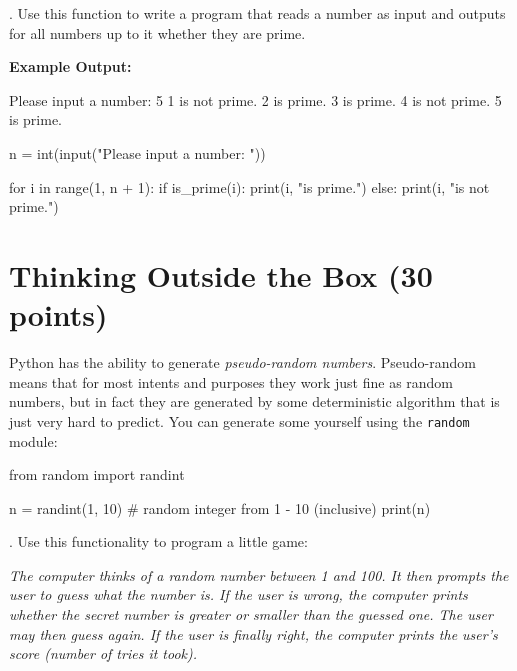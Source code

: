\vspace{1em}

. Use this function to write a program that reads a number as input and outputs for all numbers up to it whether they are prime.

\vspace{1em}

\noindent \textbf{Example Output:}

\begin{outputcode}
Please input a number: 5
1 is not prime.
2 is prime.
3 is prime.
4 is not prime.
5 is prime.
\end{outputcode}

\begin{solution}
    \begin{pythoncode}
n = int(input("Please input a number: "))

for i in range(1, n + 1):
    if is_prime(i):
        print(i, "is prime.")
    else:
        print(i, "is not prime.")
    \end{pythoncode}
\end{solution}

\section{Thinking Outside the Box (30 points)}

Python has the ability to generate \textit{pseudo-random numbers}. Pseudo-random means that for most intents and purposes they work just fine as random numbers, but in fact they are generated by some deterministic algorithm that is just very hard to predict. You can generate some yourself using the \texttt{random} module:

\begin{pythoncode}
from random import randint

n = randint(1, 10)  # random integer from 1 - 10 (inclusive)
print(n)
\end{pythoncode}

. Use this functionality to program a little game:

\vspace{1em}

\textit{The computer thinks of a random number between 1 and 100. It then prompts the user to guess what the number is. If the user is wrong, the computer prints whether the secret number is greater or smaller than the guessed one. The user may then guess again. If the user is finally right, the computer prints the user's score (number of tries it took).}

